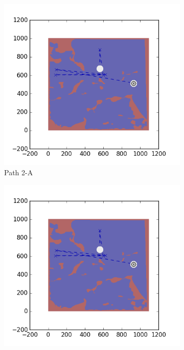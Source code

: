 \documentclass{tamuccthesis}
\begin{document}
\begin{figure}[H]
\begin{subfigure}[b]{0.24\textwidth}
        \includegraphics[width=\textwidth,trim={4cm 3cm 2cm 3cm},clip]{EXP3RG_PathBa_-1_-1_0d001_0d01.png}
        \caption{Path 2-A}
        \label{fig:Path_2-A_upReward_upWork}
    \end{subfigure}
    \begin{subfigure}[b]{0.24\textwidth}
        \centering
        \includegraphics[width=\textwidth,trim={4cm 3cm 2cm 3cm},clip]{EXP3RG_PathBa_-1_-1_0d001_0d01.png}

\end{subfigure}
\end{figure}
\end{document}
